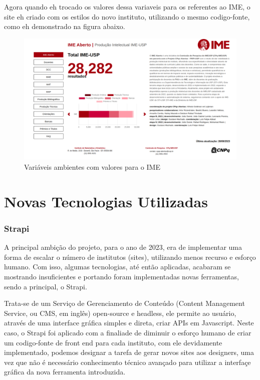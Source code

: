 \documentclass[12pt,twoside,english,brazilian]{article}
\begin{document}
Agora quando eh trocado os valores dessa variaveis para os referentes ao IME, o site eh criado com os estilos do novo instituto, utilizando o mesmo codigo-fonte, como eh demonstrado na figura abaixo.

\begin{figure}
    \centering
    \includegraphics[width=0.75\linewidth]{figuras/variaveis_ambiente_exIME.pdf}
    \caption{Variáveis  ambientes com valores para o IME}
    \label{fig:arquitetura-nova}
\end{figure}

\printbibliography[
]

\section{Novas Tecnologias Utilizadas}
\subsubsection{Strapi}
A principal ambição do projeto, para o ano de 2023, era de implementar uma forma de escalar o número de institutos (sites), utilizando menos recurso e esforço humano. Com isso, algumas tecnologias, até então aplicadas, acabaram se mostrando insuficientes e portando foram implementadas novas ferramentas, sendo a principal, o Strapi. 

Trata-se de  um Serviço de Gerenciamento de Conteúdo (Content Management Service, ou CMS, em inglês) open-source e headless, ele permite ao usuário, através de uma interface gráfica simples e direta, criar APIs em Javascript. Neste caso, o Strapi foi aplicado com a finaliade de diminuir o esforço humano de criar um codigo-fonte de front end para cada instituto, com ele devidamente implementado, podemos designar a tarefa de gerar novos sites aos designers, uma vez que não é necessário conhecimento técnico avançado para utilizar a interfaçe gráfica da nova ferramenta introduzida.
\end{document}
